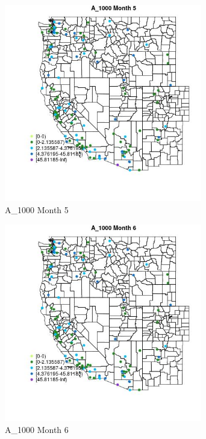 \begin{figure} 
\centering  
\includegraphics[width=0.77\textwidth]{Code_Outputs/Report_ML_input_PM25_Step4_part_e_de_duplicated_aves_MapObsMo5A_1000.jpg} 
\caption{\label{fig:Report_ML_input_PM25_Step4_part_e_de_duplicated_avesMapObsMo5A_1000}A_1000 Month 5} 
\end{figure} 
 

\begin{figure} 
\centering  
\includegraphics[width=0.77\textwidth]{Code_Outputs/Report_ML_input_PM25_Step4_part_e_de_duplicated_aves_MapObsMo6A_1000.jpg} 
\caption{\label{fig:Report_ML_input_PM25_Step4_part_e_de_duplicated_avesMapObsMo6A_1000}A_1000 Month 6} 
\end{figure} 
 

